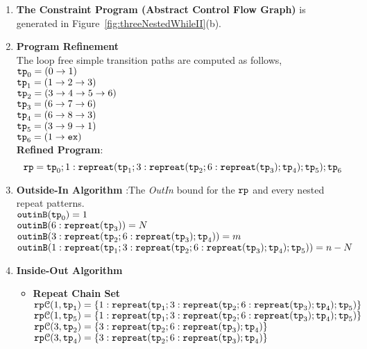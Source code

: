 \begin{enumerate}
  \item  \textbf{The Constraint Program (Abstract Control Flow Graph)} is generated in Figure~\ref{fig:threeNestedWhileII}(b).

  \item \textbf{Program Refinement}
\\
The loop free simple transition paths are computed as follows,
\\
$\mathtt{tp}_0 = (0 \to 1)$
\\
$\mathtt{tp}_1 = (1 \to 2 \to 3)$
\\
$\mathtt{tp}_2 = (3 \to 4 \to 5 \to 6)$
\\
$\mathtt{tp}_3 = (6 \to 7 \to 6)$
\\
$\mathtt{tp}_4 = (6 \to 8 \to 3)$
\\
$\mathtt{tp}_5 = (3 \to 9 \to 1)$
\\
$\mathtt{tp}_6 = (1 \to \mathtt{ex})$
\\
\textbf{Refined Program}:
\[
  \mathtt{rp} = \mathtt{tp}_0 ; 1: \mathtt{repreat}(\mathtt{tp}_1; 3: \mathtt{repreat}(\mathtt{tp}_2; 6 : \mathtt{repreat}(\mathtt{tp}_3); \mathtt{tp}_4); \mathtt{tp}_5); \mathtt{tp}_6
\]
\item \textbf{Outside-In Algorithm} :The \emph{OutIn} bound for the $\mathtt{rp}$ and every nested repeat patterns.
\\
$\mathtt{outinB}(\mathtt{tp}_0) = 1$
\\
$\mathtt{outinB}(6 : \mathtt{repreat}(\mathtt{tp}_3)) = N $
\\
$\mathtt{outinB}(3: \mathtt{repreat}(\mathtt{tp}_2; 6 : \mathtt{repreat}(\mathtt{tp}_3); \mathtt{tp}_4)) = m $
\\
$\mathtt{outinB}(1: \mathtt{repreat}(\mathtt{tp}_1; 3: \mathtt{repreat}(\mathtt{tp}_2; 6 : \mathtt{repreat}(\mathtt{tp}_3); \mathtt{tp}_4); \mathtt{tp}_5)) = n - N $
\item \textbf{Inside-Out Algorithm}
\begin{itemize}
    \item \textbf{Repeat Chain Set}
    \\
    $\mathtt{rp}\mathcal{C}(1, \mathtt{tp}_1) = \{1: \mathtt{repreat}(\mathtt{tp}_1; 3: \mathtt{repreat}(\mathtt{tp}_2; 6 : \mathtt{repreat}(\mathtt{tp}_3); \mathtt{tp}_4); \mathtt{tp}_5)\}$
    \\
    $\mathtt{rp}\mathcal{C}(1, \mathtt{tp}_5) = \{1: \mathtt{repreat}(\mathtt{tp}_1; 3: \mathtt{repreat}(\mathtt{tp}_2; 6 : \mathtt{repreat}(\mathtt{tp}_3); \mathtt{tp}_4); \mathtt{tp}_5)\}$
    \\
    $\mathtt{rp}\mathcal{C}(3, \mathtt{tp}_2) = \{3: \mathtt{repreat}(\mathtt{tp}_2; 6 : \mathtt{repreat}(\mathtt{tp}_3); \mathtt{tp}_4)\}$
    \\
    $\mathtt{rp}\mathcal{C}(3, \mathtt{tp}_4) = \{3: \mathtt{repreat}(\mathtt{tp}_2; 6 : \mathtt{repreat}(\mathtt{tp}_3); \mathtt{tp}_4)\}$
    \\

\end{itemize}
\end{enumerate}
